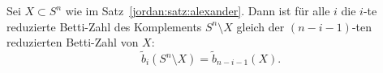 \begin{korollar}\label{jordan:korollar:alexander}
    Sei $X \subset S^n$ wie im Satz~\ref{jordan:satz:alexander}.
    Dann ist für alle $i$ die $i$-te reduzierte Betti-Zahl des
    Komplements $S^n \setminus X$ gleich der $(n-i-1)$-ten reduzierten
    Betti-Zahl von $X$:
    \[
        \tilde{b}_i(S^n \setminus X) = \tilde{b}_{n-i-1}(X).
    \]
\end{korollar}

